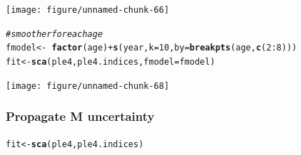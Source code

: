 \documentclass[a4paper,english,10pt]{article}\usepackage[]{graphicx}\usepackage[]{color}
\makeatletter
\newcommand{\hlnum}[1]{\textcolor[rgb]{0.686,0.059,0.569}{#1}}%
\newcommand{\hlcom}[1]{\textcolor[rgb]{0.678,0.584,0.686}{\textit{#1}}}%
\newcommand{\hlopt}[1]{\textcolor[rgb]{0,0,0}{#1}}%
\newcommand{\hlstd}[1]{\textcolor[rgb]{0.345,0.345,0.345}{#1}}%
\newcommand{\hlkwb}[1]{\textcolor[rgb]{0.69,0.353,0.396}{#1}}%
\newcommand{\hlkwc}[1]{\textcolor[rgb]{0.333,0.667,0.333}{#1}}%
\newcommand{\hlkwd}[1]{\textcolor[rgb]{0.737,0.353,0.396}{\textbf{#1}}}%
\newenvironment{kframe}{%
 \def\at@end@of@kframe{}%
 \ifinner\ifhmode%
  \def\at@end@of@kframe{\end{minipage}}%
  \begin{minipage}{\columnwidth}%
 \fi\fi%
 \def\FrameCommand##1{\hskip\@totalleftmargin \hskip-\fboxsep
 \colorbox{shadecolor}{##1}\hskip-\fboxsep
     \hskip-\linewidth \hskip-\@totalleftmargin \hskip\columnwidth}%
 \MakeFramed {\advance\hsize-\width
   \@totalleftmargin\z@ \linewidth\hsize
   \@setminipage}}%
 {\par\unskip\endMakeFramed%
 \at@end@of@kframe}
\newenvironment{knitrout}{}{} %
\makeatother
\begin{document}
\begin{knitrout}
\color{fgcolor}

{\centering \texttt{[image: figure/unnamed-chunk-66]} 

}



\end{knitrout}


\begin{knitrout}
\color{fgcolor}\begin{kframe}
\begin{alltt}
\hlcom{# smoother for each age}
\hlstd{fmodel} \hlkwb{<-} \hlopt{~}\hlkwd{factor}\hlstd{(age)} \hlopt{+} \hlkwd{s}\hlstd{(year,} \hlkwc{k} \hlstd{=} \hlnum{10}\hlstd{,} \hlkwc{by} \hlstd{=} \hlkwd{breakpts}\hlstd{(age,} \hlkwd{c}\hlstd{(}\hlnum{2}\hlopt{:}\hlnum{8}\hlstd{)))}
\hlstd{fit} \hlkwb{<-} \hlkwd{sca}\hlstd{(ple4, ple4.indices,} \hlkwc{fmodel} \hlstd{= fmodel)}
\end{alltt}
\end{kframe}
\end{knitrout}


\begin{knitrout}
\color{fgcolor}

{\centering \texttt{[image: figure/unnamed-chunk-68]} 

}



\end{knitrout}


\subsubsection{Propagate M uncertainty}


\begin{knitrout}
\color{fgcolor}\begin{kframe}
\begin{alltt}
\hlstd{fit} \hlkwb{<-} \hlkwd{sca}\hlstd{(ple4, ple4.indices)}
\end{alltt}
\end{kframe}
\end{knitrout}
\end{document}
